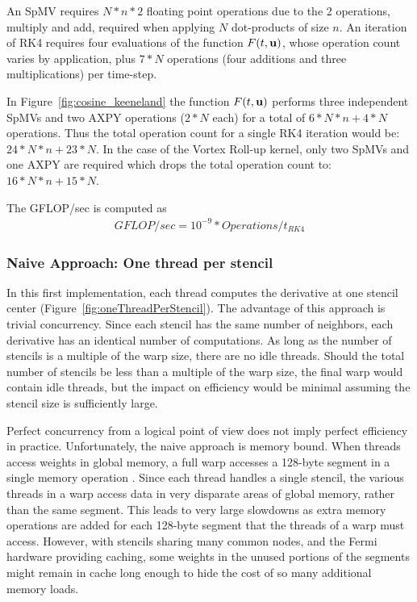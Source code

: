 \documentclass{report}
\begin{document}
An SpMV requires $N * n * 2$ floating point operations due to the 2 operations, multiply and add, required when applying $N$ dot-products of size $n$. An iteration of RK4 requires four evaluations of the function $F(t,\mathbf{u})$, whose operation count varies by application, plus $7*N$ operations (four additions and three multiplications) per time-step. 

In Figure~\ref{fig:cosine_keeneland} the function $F(t,\mathbf{u})$ performs three independent SpMVs and two AXPY operations ($2*N$ each) for a total of $6*N*n + 4*N$ operations. Thus the total operation count for a single RK4 iteration would be: $24*N*n +23*N$. 
In the case of the Vortex Roll-up kernel, only two SpMVs and one AXPY are required which drops the total operation count to: $16*N*n + 15*N$. 

The GFLOP/sec is computed as 
\begin{align}
GFLOP/sec = 10^{-9} * Operations / t_{RK4}
\end{align}



\subsubsection{Naive Approach: One thread per stencil}

In this first implementation, each thread computes 
the derivative at one stencil center  (Figure~\ref{fig:oneThreadPerStencil}). 
The advantage of this approach is trivial concurrency.  Since each stencil has the same number of neighbors, each derivative has an identical number of computations. As long as the number of stencils is a multiple of the warp size, there are no idle threads. Should the total number of stencils be less than a multiple of the warp size, the final warp would contain idle threads, but the impact on efficiency would be minimal assuming the stencil size is sufficiently large. 

Perfect concurrency from a logical point of view does not 
imply perfect efficiency in practice. 
Unfortunately, the naive approach 
is memory bound. When threads access weights in global memory, 
a full warp accesses a 128-byte segment in a single memory operation \cite{CudaGuide2011}.
Since each thread handles a single stencil, the various threads in a warp access data in very disparate areas of global memory, rather than the same segment. This leads to very large slowdowns as extra memory operations are added for each 128-byte segment that the threads of a warp must access.
However, with stencils sharing many common nodes, and the Fermi hardware providing caching, some weights in the unused portions of the segments might remain in cache long enough to hide the cost of so many additional memory loads. 
\end{document}
